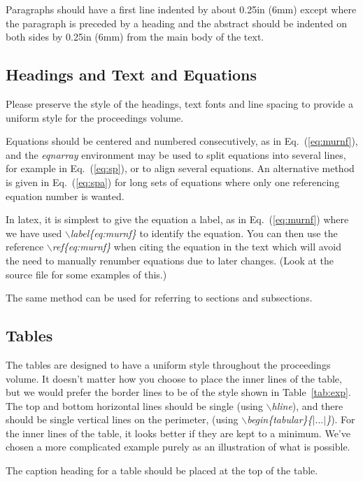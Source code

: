 \documentclass{ws-p8-50x6-00}
\begin{document}
Paragraphs should have a first line indented by about 0.25in
(6mm) except where the paragraph is preceded by a heading and
the abstract should be indented on both sides by 0.25in (6mm)
from the main body of the text.

\subsection{Headings and Text and Equations}
Please preserve the style of the headings, text fonts and line
spacing to provide a uniform style for the proceedings volume.

Equations should be centered and numbered consecutively, as in
Eq.~(\ref{eq:murnf}), and the {\em eqnarray} environment may be
used to split equations into several lines, for example in
Eq.~(\ref{eq:sp}), or to align several equations.  An alternative
method is given in Eq.~(\ref{eq:spa}) for long sets of equations
where only one referencing equation number is wanted.

In latex, it is simplest to give the equation a label, as in
Eq.~(\ref{eq:murnf}) where we have used 
{\em $\backslash$label\{eq:murnf\}} to identify the equation.
You can then use the reference {\em $\backslash$ref\{eq:murnf\}}
when citing the equation in the text which will avoid the need
to manually renumber equations due to later changes. (Look at
the source file for some examples of this.)

The same method can be used for referring to sections 
and subsections.

\subsection{Tables}
The tables are designed to have a uniform style throughout the
proceedings volume. It doesn't matter how you choose to place
the inner lines of the table, but we would prefer the border
lines to be of the style shown in Table~\ref{tab:exp}.  
The top and bottom horizontal lines should be single 
(using {\em $\backslash$hline}), and there should be single 
vertical lines on the perimeter, (using 
{\em  $\backslash$begin\{tabular\}\{$|...|$\}}).  For the inner
lines of the table, it looks better if they are kept to a
minimum. We've chosen a more complicated example purely as an 
illustration of what is possible.

The caption heading for a table should be placed at the top of
the table.
\end{document}
